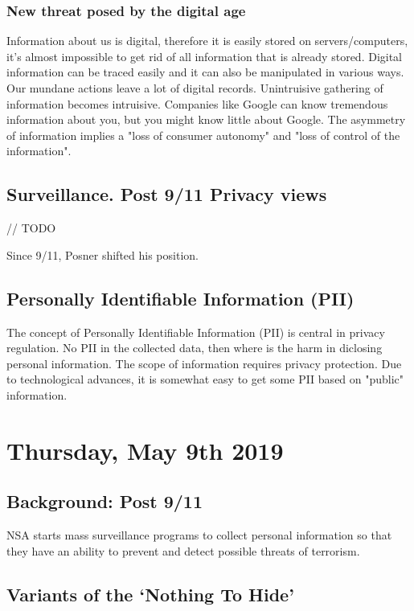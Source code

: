 \documentclass{article}
\begin{document}
\subsubsection{New threat posed by the digital age}

Information about us is digital, therefore it is easily stored on servers/computers, it's almost impossible to get rid of all information that is already stored. Digital information can be traced easily and it can also be manipulated in various ways. Our mundane actions leave a lot of digital records. Unintruisive gathering of information becomes intruisive. Companies like Google can know tremendous information about you, but you might know little about Google. The asymmetry of information implies a "loss of consumer autonomy" and "loss of control of the information".

\subsection{Surveillance. Post 9/11 Privacy views}

// TODO

Since 9/11, Posner shifted his position.

\subsection{Personally Identifiable Information (PII)}

The concept of Personally Identifiable Information (PII) is central in privacy regulation. No PII in the collected data, then where is the harm in diclosing personal information. The scope of information requires privacy protection. Due to technological advances, it is somewhat easy to get some PII based on "public" information.

\section{Thursday, May 9th 2019}

\subsection{Background: Post 9/11}

NSA starts mass surveillance programs to collect personal information so that they have an ability to prevent and detect possible threats of terrorism.


\subsection*{Variants of the `Nothing To Hide'}
\end{document}
